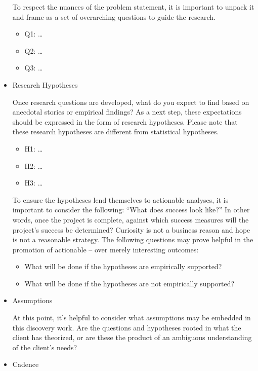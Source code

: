 \documentclass[]{book}
\providecommand{\tightlist}{%
  \setlength{\itemsep}{0pt}\setlength{\parskip}{0pt}}
\begin{document}
\begin{itemize}
  To respect the nuances of the problem statement, it is important to unpack it and frame as a set of overarching questions to guide the research.

  \begin{itemize}
  \tightlist
  \item
    Q1: \ldots{}
  \item
    Q2: \ldots{}
  \item
    Q3: \ldots{}
  \end{itemize}
\item
  Research Hypotheses

  Once research questions are developed, what do you expect to find based on anecdotal stories or empirical findings? As a next step, these expectations should be expressed in the form of research hypotheses. Please note that these research hypotheses are different from statistical hypotheses.

  \begin{itemize}
  \tightlist
  \item
    H1: \ldots{}
  \item
    H2: \ldots{}
  \item
    H3: \ldots{}
  \end{itemize}

  To ensure the hypotheses lend themselves to actionable analyses, it is important to consider the following: ``What does success look like?'' In other words, once the project is complete, against which success measures will the project's success be determined? Curiosity is not a business reason and hope is not a reasonable strategy. The following questions may prove helpful in the promotion of actionable -- over merely interesting outcomes:

  \begin{itemize}
  \tightlist
  \item
    What will be done if the hypotheses are empirically supported?
  \item
    What will be done if the hypotheses are not empirically supported?
  \end{itemize}
\item
  Assumptions

  At this point, it's helpful to consider what assumptions may be embedded in this discovery work. Are the questions and hypotheses rooted in what the client has theorized, or are these the product of an ambiguous understanding of the client's needs?
\item
  Cadence


\end{itemize}
\end{document}
